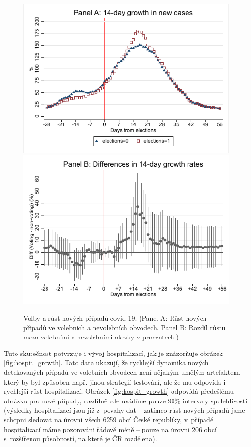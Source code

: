 \begin{figure}[ht]
     \begin{center}
    \includegraphics[scale=0.58]{binscatter_new_cases14.pdf} 
    \includegraphics[scale=0.58]{Covid+_growth_rate14.pdf} 
	\caption{Volby a růst nových případů covid-19. (Panel A: Růst nových případů ve volebních a nevolebních obvodech. Panel B: Rozdíl růstu mezo volebními a nevolebními okrsky v procentech.)}
    \label{fig:Covid_growth14}
	\end{center}
\end{figure}

Tuto skutečnost potvrzuje i vývoj hospitalizací, jak je znázorňuje obrázek \ref{fig:hospit_growth}. Tato data ukazují, že rychlejší dynamika nových detekovaných případů ve volebních obvodech není nějakým umělým artefaktem, který by byl způsoben např. jinou strategií testování, ale že mu odpovídá i rychlejší růst hospitalizací. Obrázek  \ref{fig:hospit_growth} odpovídá předešlému obrázku pro nové případy, rozdílně zde uvádíme pouze 90\% intervaly spolehlivosti (výsledky hospitalizací jsou  již z~povahy dat -- zatímco růst nových případů jsme schopni sledovat na úrovni všech 6259 obcí České republiky, v~případě hospitalizací máme pozorování řádově méně -- pouze na úrovni 206 obcí s~rozšířenou působností, na které je ČR rozdělena).

